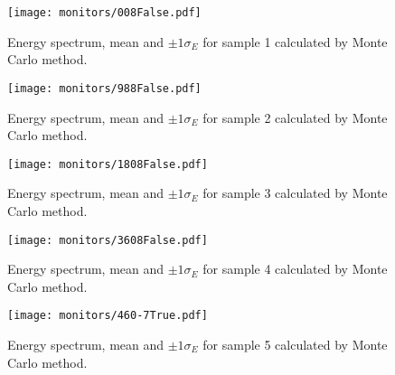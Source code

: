 \begin{figure}[htb]
\texttt{[image: monitors/008False.pdf]}
\caption{Energy spectrum, mean and $\pm 1\sigma_E$ for sample 1 calculated by Monte Carlo method.}
\label{fig:Spectrum1}
\end{figure}

\begin{figure}[htb]
\texttt{[image: monitors/988False.pdf]}
\caption{Energy spectrum, mean and $\pm 1\sigma_E$ for sample 2 calculated by Monte Carlo method.}
\label{fig:Spectrum2}
\end{figure}

\begin{figure}[htb]
\texttt{[image: monitors/1808False.pdf]}
\caption{Energy spectrum, mean and $\pm 1\sigma_E$ for sample 3 calculated by Monte Carlo method.}
\label{fig:Spectrum3}
\end{figure}

\begin{figure}[htb]
\texttt{[image: monitors/3608False.pdf]}
\caption{Energy spectrum, mean and $\pm 1\sigma_E$ for sample 4 calculated by Monte Carlo method.}
\label{fig:Spectrum4}
\end{figure}

\begin{figure}[htb]
\texttt{[image: monitors/460-7True.pdf]}
\caption{Energy spectrum, mean and $\pm 1\sigma_E$ for sample 5 calculated by Monte Carlo method.}
\label{fig:Spectrum5}
\end{figure}

